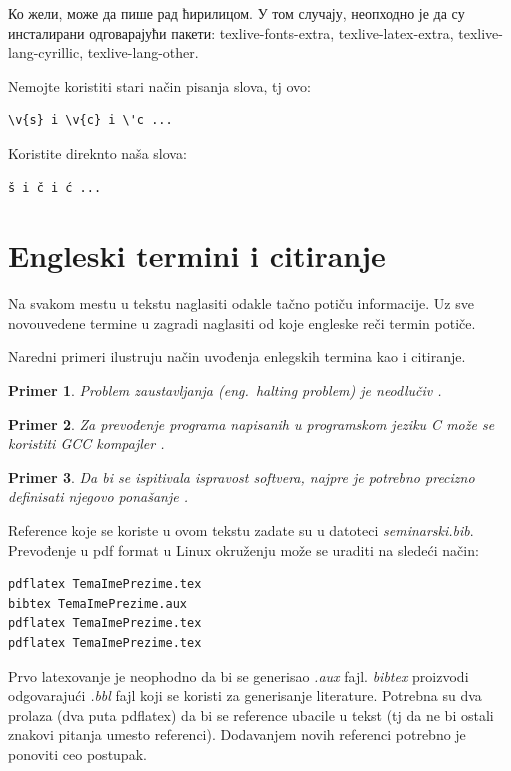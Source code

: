 \documentclass[a4paper]{article}
\newtheorem{primer}{Primer}[section]
\begin{document}
Ко жели, може да пише рад ћирилицом. У том случају, неопходно је да су инсталирани одговарајући пакети: texlive-fonts-extra, texlive-latex-extra, texlive-lang-cyrillic, texlive-lang-other.

Nemojte koristiti stari način pisanja slova, tj ovo:
\begin{verbatim}
\v{s} i \v{c} i \'c ...
\end{verbatim}
Koristite direknto naša slova:
\begin{verbatim}
š i č i ć ...
\end{verbatim}


\section{Engleski termini i citiranje}
\label{sec:termini_i_citiranje}

Na svakom mestu u tekstu naglasiti odakle tačno potiču informacije. Uz sve novouvedene termine u zagradi naglasiti od koje engleske reči termin potiče.

Naredni primeri ilustruju način uvođenja enlegskih termina kao i citiranje.

\begin{primer}
Problem zaustavljanja (eng.~{\em halting problem}) je neodlučiv \cite{haltingproblem}.
\end{primer}

\begin{primer}
Za prevođenje programa napisanih u programskom jeziku C može se koristiti GCC kompajler \cite{gcc}.
\end{primer}

\begin{primer}
 Da bi se ispitivala ispravost softvera, najpre je potrebno precizno definisati njegovo ponašanje \cite{laski2009software}.
\end{primer}

Reference koje se koriste u ovom tekstu zadate su u datoteci {\em seminarski.bib}. Prevođenje u pdf format u Linux okruženju može se uraditi na sledeći način:
\begin{verbatim}
pdflatex TemaImePrezime.tex
bibtex TemaImePrezime.aux
pdflatex TemaImePrezime.tex
pdflatex TemaImePrezime.tex
\end{verbatim}
Prvo latexovanje je neophodno da bi se generisao {\em .aux} fajl. {\em bibtex} proizvodi odgovarajući {\em .bbl} fajl koji se koristi za generisanje literature.
Potrebna su dva prolaza (dva puta pdflatex) da bi se reference ubacile u tekst (tj da ne bi ostali znakovi pitanja umesto referenci). Dodavanjem novih referenci potrebno je ponoviti ceo postupak.
\end{document}
